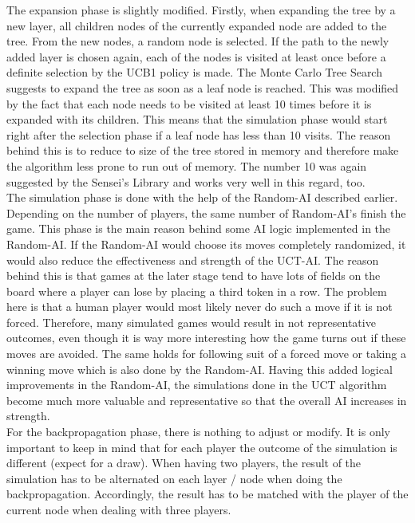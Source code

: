 \documentclass[english]{report} \usepackage[english]{babel}
\begin{document}
The expansion phase is slightly modified. Firstly, when expanding the tree by a
new layer, all children nodes of the currently expanded node are added to the
tree. From the new nodes, a random node is selected. If the path to the newly
added layer is chosen again, each of the nodes is visited at least once before a
definite selection by the UCB1 policy is made. The Monte Carlo Tree Search
suggests to expand the tree as soon as a leaf node is reached. This was modified
by the fact that each node needs to be visited at least 10 times before it is
expanded with its children. This means that the simulation phase would start
right after the selection phase if a leaf node has less than 10 visits. The
reason behind this is to reduce to size of the tree stored in memory and
therefore make the algorithm less prone to run out of memory. The number 10 was
again suggested by the Sensei's Library and works very well in this regard, too.\\

The simulation phase is done with the help of the Random-AI described earlier.
Depending on the number of players, the same number of Random-AI's finish the
game. This phase is the main reason behind some AI logic implemented in the
Random-AI. If the Random-AI would choose its moves completely randomized, it
would also reduce the effectiveness and strength of the UCT-AI. The reason
behind this is that games at the later stage tend to have lots of fields on the
board where a player can lose by placing a third token in a row. The problem
here is that a human player would most likely never do such a move if it is not
forced. Therefore, many simulated games would result in not representative
outcomes, even though it is way more interesting how the game turns out if these
moves are avoided. The same holds for following suit of a forced move or taking
a winning move which is also done by the Random-AI. Having this added logical
improvements in the Random-AI, the simulations done in the UCT algorithm become
much more valuable and representative so that the overall AI increases in
strength.\\

For the backpropagation phase, there is nothing to adjust or modify. It is only
important to keep in mind that for each player the outcome of the simulation is
different (expect for a draw). When having two players, the result of the
simulation has to be alternated on each layer / node when doing the
backpropagation. Accordingly, the result has to be matched with the player of
the current node when dealing with three players.\\
\end{document}
